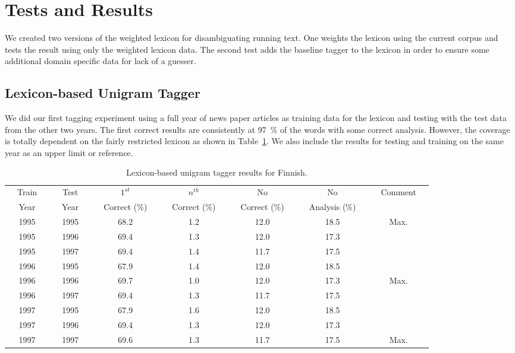 \documentclass[postprint]{flammie}
\begin{document}
\section{Tests and  Results}
\label{Sect5}

We created two versions of the weighted lexicon for disambiguating
running text. One weights the lexicon using the current corpus and
tests the result using only the weighted lexicon data. The second test
adds the baseline tagger to the lexicon in order to ensure some
additional domain specific data for lack of a guesser.

\subsection{Lexicon-based Unigram Tagger}

We did our first tagging experiment using a full year of news paper
articles as training data for the lexicon and testing with the test
data from the other two years. The first correct results are
consistently at 97~\% of the words with some correct
analysis. However, the coverage is totally dependent on the fairly
restricted lexicon as shown in Table~\ref{tab:taggerresults1}. We also
include the results for testing and training on the same year as an
upper limit or reference.

\begin{table}[h!]
  \centering
  \caption{Lexicon-based unigram tagger results for Finnish.
  }\label{tab:taggerresults1}
  \begin{scriptsize}
    \begin{tabular}{c|c|c|c|c|c|c}
      \hline
      ~~Train~~ & ~~Test~~ & ~~$1^{st}$~~& ~~$n^{th}$~~ & ~~No~~ & ~~No~~ & ~~Comment~~\\
      ~~Year~~ & ~~Year~~ & ~~Correct (\%)~~ & ~~Correct (\%)~~ & ~~Correct (\%)~~ & ~~Analysis (\%)~~ \\
      \hline 
      1995 & 1995 & 68.2 & 1.2 & 12.0 & 18.5 & ~~Max.~~\\
      1995 & 1996 & 69.4 & 1.3 & 12.0 & 17.3 & \\
      1995 & 1997 & 69.4 & 1.4 & 11.7 & 17.5 & \\
      \hline 
      1996 & 1995 & 67.9 & 1.4 & 12.0 & 18.5 & \\
      1996 & 1996 & 69.7 & 1.0 & 12.0 & 17.3 & ~~Max.~~\\
      1996 & 1997 & 69.4 & 1.3 & 11.7 & 17.5 & \\
      \hline 
      1997 & 1995 & 67.9 & 1.6 & 12.0 & 18.5 & \\
      1997 & 1996 & 69.4 & 1.3 & 12.0 & 17.3 & \\
      1997 & 1997 & 69.6 & 1.3 & 11.7 & 17.5 & ~~Max.~~\\
      \hline 
    \end{tabular}
  \end{scriptsize}
\end{table}
\end{document}
